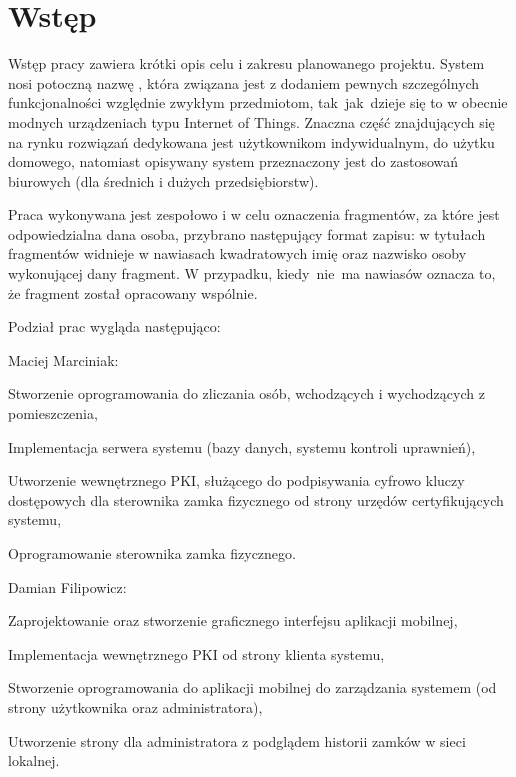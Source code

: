\newpage\section{Wstęp}\label{sec:wstep}
Wstęp pracy zawiera krótki opis celu i zakresu planowanego projektu. System nosi potoczną nazwę \linebreak \NazwaSys, która związana jest z dodaniem  pewnych szczególnych funkcjonalności względnie zwykłym przedmiotom, tak~jak~dzieje się to w obecnie modnych urządzeniach\cite{porownanie zamkow} typu Internet of Things. Znaczna część znajdujących się na rynku rozwiązań dedykowana jest użytkownikom indywidualnym, do użytku domowego, natomiast opisywany system przeznaczony jest do zastosowań biurowych (dla średnich i dużych przedsiębiorstw).

Praca wykonywana jest zespołowo i w celu oznaczenia fragmentów, za które jest odpowiedzialna dana osoba, przybrano następujący format zapisu: w  tytułach fragmentów widnieje w nawiasach kwadratowych imię oraz nazwisko osoby wykonującej dany fragment. W przypadku, kiedy~nie~ma nawiasów oznacza to, że fragment został opracowany wspólnie.

Podział prac wygląda następująco:
\begin{itemize*}
	\item Maciej Marciniak:
	\begin{enumerate*}
		\item Stworzenie oprogramowania do zliczania osób, wchodzących i wychodzących z pomieszczenia,
		\item Implementacja serwera systemu (bazy danych, systemu kontroli uprawnień),
		\item Utworzenie wewnętrznego PKI, służącego do podpisywania cyfrowo kluczy dostępowych dla sterownika zamka fizycznego od strony urzędów certyfikujących systemu,
		\item Oprogramowanie sterownika zamka fizycznego.
	\end{enumerate*}
	\item Damian Filipowicz:
	\begin{enumerate*}
		\item Zaprojektowanie oraz stworzenie graficznego interfejsu aplikacji mobilnej,
		\item Implementacja wewnętrznego PKI od strony klienta systemu,
		\item Stworzenie oprogramowania do aplikacji mobilnej do zarządzania systemem (od strony użytkownika oraz administratora),
		\item Utworzenie strony dla administratora z podglądem historii zamków w sieci lokalnej.	
	\end{enumerate*}
\end{itemize*}

